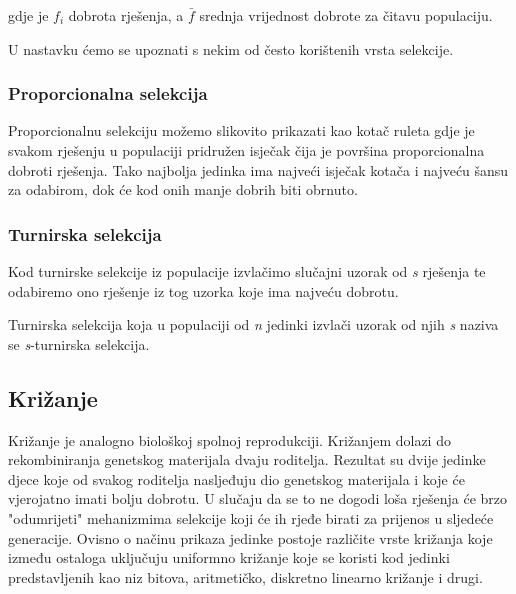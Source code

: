 \documentclass[times, utf8, zavrsni]{fer}
\begin{document}
gdje je $f_i$ dobrota rješenja, a $\bar{f}$ srednja vrijednost dobrote za čitavu populaciju. 

U nastavku ćemo se upoznati s nekim od često korištenih vrsta selekcije.

\subsubsection{Proporcionalna selekcija}

Proporcionalnu selekciju možemo slikovito prikazati kao kotač ruleta gdje je svakom rješenju u populaciji pridružen isječak čija je površina proporcionalna dobroti rješenja. Tako najbolja jedinka ima najveći isječak kotača i najveću šansu za odabirom, dok će kod onih manje dobrih biti obrnuto.

\subsubsection{Turnirska selekcija}

Kod turnirske selekcije iz populacije izvlačimo slučajni uzorak od \textit{s} rješenja te odabiremo ono rješenje iz tog uzorka koje ima najveću dobrotu. 

Turnirska selekcija koja u populaciji od \textit{n} jedinki izvlači uzorak od njih \textit{s} naziva se \textit{s}-turnirska selekcija.

\subsection{Križanje}
Križanje je analogno biološkoj spolnoj reprodukciji. Križanjem dolazi do rekombiniranja genetskog materijala dvaju roditelja. Rezultat su dvije jedinke djece koje od svakog roditelja nasljeđuju dio genetskog materijala i koje će vjerojatno imati bolju dobrotu. U slučaju da se to ne dogodi loša rješenja će brzo "odumrijeti" mehanizmima selekcije koji će ih rjeđe birati za prijenos u sljedeće generacije. Ovisno o načinu prikaza jedinke postoje različite vrste križanja koje između ostaloga uključuju uniformno križanje koje se koristi kod jedinki predstavljenih kao niz bitova, aritmetičko, diskretno linearno križanje i drugi.
\end{document}
